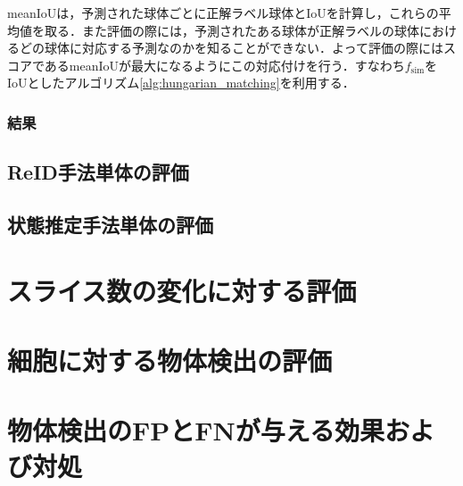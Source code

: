     meanIoUは，予測された球体ごとに正解ラベル球体とIoUを計算し，これらの平均値を取る．また評価の際には，予測されたある球体が正解ラベルの球体におけるどの球体に対応する予測なのかを知ることができない．よって評価の際にはスコアであるmeanIoUが最大になるようにこの対応付けを行う．すなわち$f_{\text{sim}}$をIoUとしたアルゴリズム\ref{alg:hungarian_matching}を利用する．

    \subsubsection{結果}
    

    \subsection{ReID手法単体の評価}
    \label{subsec:evaluate_reidentification}

    \subsection{状態推定手法単体の評価}
    \label{subsec:evaluate_estimation}

\section{スライス数の変化に対する評価}
\label{sec:number_of_slice}

\section{細胞に対する物体検出の評価}
\label{sec:cell_detection}

\section{物体検出のFPとFNが与える効果および対処}
\label{sec:covering_detection}
